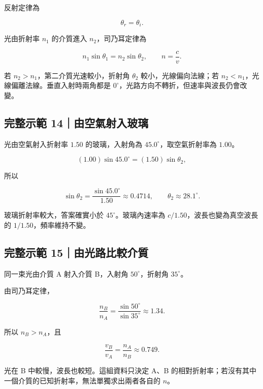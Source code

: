 \documentclass[11pt,a4paper]{article}
\begin{document}
反射定律為

\[
\theta_r=\theta_i.
\]

光由折射率 \(n_1\) 的介質進入 \(n_2\)，司乃耳定律為

\[
n_1\sin\theta_1=n_2\sin\theta_2,
\qquad
n=\frac{c}{v}.
\]

若 \(n_2>n_1\)，第二介質光速較小，折射角 \(\theta_2\) 較小，光線偏向法線；若 \(n_2<n_1\)，光線偏離法線。垂直入射時兩角都是 \(0^\circ\)，光路方向不轉折，但速率與波長仍會改變。

\begin{HandoutWorkedExample}

\subsection{完整示範 14｜由空氣射入玻璃}\label{ux5b8cux6574ux793aux7bc4-14ux7531ux7a7aux6c23ux5c04ux5165ux73bbux7483}

光由空氣射入折射率 \(1.50\) 的玻璃，入射角為 \(45.0^\circ\)，取空氣折射率為 \(1.00\)。

\[
(1.00)\sin45.0^\circ
=(1.50)\sin\theta_2,
\]

所以

\[
\sin\theta_2=\frac{\sin45.0^\circ}{1.50}
\approx0.4714,
\qquad
\theta_2\approx28.1^\circ.
\]

玻璃折射率較大，答案確實小於 \(45^\circ\)。玻璃內速率為 \(c/1.50\)，波長也變為真空波長的 \(1/1.50\)，頻率維持不變。

\end{HandoutWorkedExample}

\begin{HandoutWorkedExample}

\subsection{完整示範 15｜由光路比較介質}\label{ux5b8cux6574ux793aux7bc4-15ux7531ux5149ux8defux6bd4ux8f03ux4ecbux8cea}

同一束光由介質 A 射入介質 B，入射角 \(50^\circ\)，折射角 \(35^\circ\)。

由司乃耳定律，

\[
\frac{n_B}{n_A}
=\frac{\sin50^\circ}{\sin35^\circ}
\approx1.34.
\]

所以 \(n_B>n_A\)，且

\[
\frac{v_B}{v_A}=\frac{n_A}{n_B}\approx0.749.
\]

光在 B 中較慢，波長也較短。這組資料只決定 A、B 的相對折射率；若沒有其中一個介質的已知折射率，無法單獨求出兩者各自的 \(n\)。

\end{HandoutWorkedExample}
\end{document}
